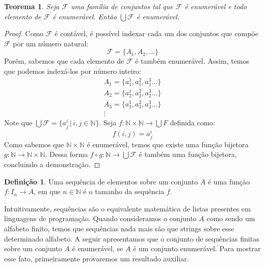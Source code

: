 \documentclass[a4paper]{article}
\newtheorem{Theorem}{Teorema}
\theoremstyle{definition}
\newtheorem{Definition}{Definição}
\begin{document}
  \begin{Theorem}
    Seja $\mathcal{F}$ uma família de conjuntos tal que $\mathcal{F}$ é
    enumerável e todo elemento de $\mathcal{F}$ é enumerável. Então
    $\bigcup \mathcal{F}$ é enumerável.
  \end{Theorem}
  \begin{proof}
    Como $\mathcal{F}$ é contável, é possível indexar cada um dos conjuntos que
    compõe $\mathcal{F}$ por um número natural:
    \[
      \mathcal{F} =\{A_1,A_2,...\}
    \]
    Porém, sabemos que cada elemento de $\mathcal{F}$ é também enumerável.
    Assim, temos que podemos indexá-los por número inteiro:
    \[
      \begin{array}{l}
        A_1 = \{a^1_1, a^2_1,a^3_1...\}\\
        A_2 = \{a^1_2, a^2_2,a^3_2...\}\\
        A_3 = \{a^1_3, a^2_3,a^3_3...\}\\
        \vdots
      \end{array}
    \]
    Note que $\bigcup\mathcal{F} = \{a^i_j\,|\,i,j\in\mathbb{N}\}$. Seja $f :
    \mathbb{N}\times\mathbb{N} \to \bigcup{F}$ definida como:
    \[
      f(i,j) = a^i_j
    \]
    Como sabemos que $\mathbb{N} \times \mathbb{N}$ é enumerável, temos que
    existe uma função bijetora $g : \mathbb{N} \to \mathbb{N} \times
    \mathbb{N}$. Dessa forma $f \circ g : \mathbb{N} \to \bigcup\mathcal{F}$
    é também uma função bijetora, concluindo a demonstração.
  \end{proof}

  \begin{Definition}
    Uma sequência de elementos sobre um conjunto $A$ é uma função $f : I_n\to
    A$, em que $n \in \mathbb{N}$ é o tamanho da sequência $f$.
  \end{Definition}

  Intuitivamente, sequências são o equivalente matemática de listas presentes em
  linguagens de programação. Quando consideramos o conjunto $A$ como sendo um
  alfabeto finito, temos que sequências nada mais são que strings sobre esse
  determinado alfabeto. A seguir apresentamos que o conjunto de sequências
  finitas sobre um conjunto $A$ é enumerável, se $A$ é um conjunto enumerável.
  Para mostrar esse fato, primeiramente provaremos um resultado auxiliar.
\end{document}
